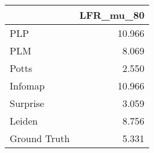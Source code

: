 \begin{tabular}{lr}
\toprule
{} & LFR_mu_80 \\
\midrule
PLP          &    10.966 \\
PLM          &     8.069 \\
Potts        &     2.550 \\
Infomap      &    10.966 \\
Surprise     &     3.059 \\
Leiden       &     8.756 \\
Ground Truth &     5.331 \\
\bottomrule
\end{tabular}
